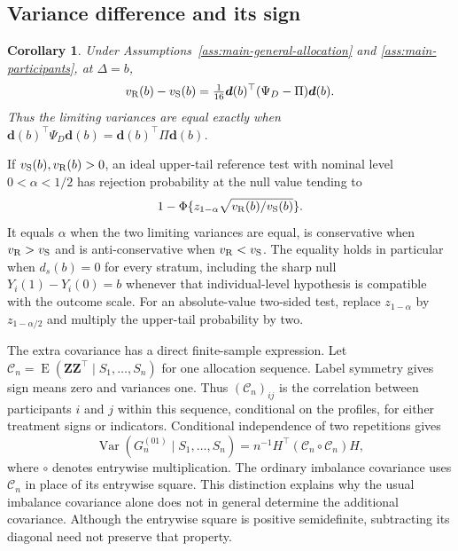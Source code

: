 \documentclass[12pt,a4paper]{article}
\newtheorem{corollary}{Corollary}
\theoremstyle{definition}
\newcommand{\E}{\operatorname E}
\newcommand{\Var}{\operatorname{Var}}
\begin{document}
\subsection{Variance difference and its sign}\label{sec:main-sign}
\begin{corollary}\label{cor:main-variance-difference}
Under Assumptions~\ref{ass:main-general-allocation} and \ref{ass:main-participants}, at $\Delta=b$,
\begin{equation}\label{eq:gap-main}
 v_{\rm R}(b)-v_{\rm S}(b)=\tfrac1{16}\bm d(b)^\top
                                  (\Psi_D-\Pi)\bm d(b).
\end{equation}
Thus the limiting variances are equal exactly when $\bm d(b)^\top\Psi_D\bm d(b)=\bm d(b)^\top\Pi\bm d(b)$.
\end{corollary}

If $v_{\rm S}(b),v_{\rm R}(b)>0$, an ideal upper-tail reference test with nominal level $0<\alpha<1/2$ has rejection probability at the null value tending to
\begin{equation}\label{eq:size-distortion-main}
 1-\Phi\{z_{1-\alpha}\sqrt{v_{\rm R}(b)/v_{\rm S}(b)}\}.
\end{equation}
It equals $\alpha$ when the two limiting variances are equal, is conservative when $v_{\rm R}>v_{\rm S}$ and is anti-conservative when $v_{\rm R}<v_{\rm S}$. The equality holds in particular when $d_s(b)=0$ for every stratum, including the sharp null $Y_i(1)-Y_i(0)=b$ whenever that individual-level hypothesis is compatible with the outcome scale. For an absolute-value two-sided test, replace $z_{1-\alpha}$ by $z_{1-\alpha/2}$ and multiply the upper-tail probability by two.

The extra covariance has a direct finite-sample expression. Let $\mathcal C_n=\E(\bm Z\bm Z^\top\mid S_1,\ldots,S_n)$ for one allocation sequence. Label symmetry gives sign means zero and variances one. Thus $(\mathcal C_n)_{ij}$ is the correlation between participants $i$ and $j$ within this sequence, conditional on the profiles, for either treatment signs or indicators. Conditional independence of two repetitions gives
\begin{equation}\label{eq:main-square-covariance}
 \Var(G_n^{(01)}\mid S_1,\ldots,S_n)
       =n^{-1}H^\top(\mathcal C_n\circ\mathcal C_n)H,
\end{equation}
where $\circ$ denotes entrywise multiplication. The ordinary imbalance covariance uses $\mathcal C_n$ in place of its entrywise square. This distinction explains why the usual imbalance covariance alone does not in general determine the additional covariance. Although the entrywise square is positive semidefinite, subtracting its diagonal need not preserve that property.
\end{document}
